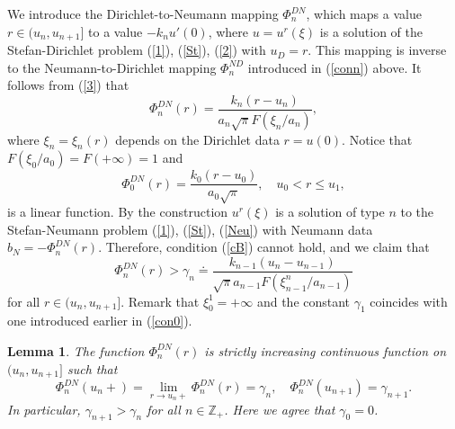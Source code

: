 \documentclass[12pt]{article}
\theoremstyle{plain}
\newtheorem{lemma}{Lemma}[section]
\theoremstyle{definition}
\numberwithin{equation}{section}
\newcommand{\Z}{{\mathbb Z}}
\begin{document}
We introduce the Dirichlet-to-Neumann mapping $\Phi^{DN}_n$, which maps a value $r\in (u_n,u_{n+1}]$ to a value $-k_nu'(0)$, where $u=u^r(\xi)$ is a solution of the Stefan-Dirichlet problem (\ref{1}), (\ref{St}), (\ref{2}) with  $u_D=r$. This mapping is inverse to the Neumann-to-Dirichlet mapping $\Phi^{ND}_n$ introduced in (\ref{conn}) above. It follows from (\ref{3}) that
\begin{equation}\label{dnn}
\Phi^{DN}_n(r)=\frac{k_n(r-u_n)}{a_n\sqrt{\pi}F(\xi_n/a_n)},
\end{equation}
where $\xi_n=\xi_n(r)$ depends on the Dirichlet data $r=u(0)$. Notice that ${F(\xi_0/a_0)=F(+\infty)=1}$ and
\begin{equation}\label{dn0}\Phi^{DN}_0(r)=\frac{k_0(r-u_0)}{a_0\sqrt{\pi}}, \quad u_0<r\le u_1,\end{equation}
is a linear function. By the construction $u^r(\xi)$ is a solution of type $n$ to the Stefan-Neumann problem (\ref{1}), (\ref{St}), (\ref{Neu}) with Neumann data
$b_N=-\Phi^{DN}_n(r)$. Therefore, condition (\ref{cB}) cannot hold, and we claim that
\[\Phi^{DN}_n(r)>\gamma_n\doteq\frac{k_{n-1}(u_n-u_{n-1})}{\sqrt{\pi}a_{n-1}F(\xi_{n-1}^n/a_{n-1})}\]
for all $r\in (u_n,u_{n+1}]$. Remark that $\xi^1_0=+\infty$ and the constant $\gamma_1$ coincides with one introduced earlier in (\ref{con0}).

\begin{lemma}\label{lem2}
The function $\Phi^{DN}_n(r)$ is strictly increasing continuous function on $(u_n,u_{n+1}]$ such that
\[
\Phi^{DN}_n(u_n+)=\lim_{r\to u_n+}\Phi^{DN}_n(r)=\gamma_n, \quad \Phi^{DN}_n(u_{n+1})=\gamma_{n+1}.
\]
In particular, $\gamma_{n+1}>\gamma_n$ for all $n\in\Z_+$. Here we agree that $\gamma_0=0$.
\end{lemma}
\end{document}
